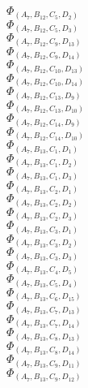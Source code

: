\documentclass[14pt]{article}
\begin{document}
    $\Phi_{({A}_{7}, {B}_{12}, {C}_{5}, {D}_{2})}$ \\ 
    $\Phi_{({A}_{7}, {B}_{12}, {C}_{5}, {D}_{3})}$ \\ 
    $\Phi_{({A}_{7}, {B}_{12}, {C}_{9}, {D}_{13})}$ \\ 
    $\Phi_{({A}_{7}, {B}_{12}, {C}_{9}, {D}_{14})}$ \\ 
    $\Phi_{({A}_{7}, {B}_{12}, {C}_{10}, {D}_{13})}$ \\ 
    $\Phi_{({A}_{7}, {B}_{12}, {C}_{10}, {D}_{14})}$ \\ 
    $\Phi_{({A}_{7}, {B}_{12}, {C}_{13}, {D}_{9})}$ \\ 
    $\Phi_{({A}_{7}, {B}_{12}, {C}_{13}, {D}_{10})}$ \\ 
    $\Phi_{({A}_{7}, {B}_{12}, {C}_{14}, {D}_{9})}$ \\ 
    $\Phi_{({A}_{7}, {B}_{12}, {C}_{14}, {D}_{10})}$ \\ 
    $\Phi_{({A}_{7}, {B}_{13}, {C}_{1}, {D}_{1})}$ \\ 
    $\Phi_{({A}_{7}, {B}_{13}, {C}_{1}, {D}_{2})}$ \\ 
    $\Phi_{({A}_{7}, {B}_{13}, {C}_{1}, {D}_{3})}$ \\ 
    $\Phi_{({A}_{7}, {B}_{13}, {C}_{2}, {D}_{1})}$ \\ 
    $\Phi_{({A}_{7}, {B}_{13}, {C}_{2}, {D}_{2})}$ \\ 
    $\Phi_{({A}_{7}, {B}_{13}, {C}_{2}, {D}_{3})}$ \\ 
    $\Phi_{({A}_{7}, {B}_{13}, {C}_{3}, {D}_{1})}$ \\ 
    $\Phi_{({A}_{7}, {B}_{13}, {C}_{3}, {D}_{2})}$ \\ 
    $\Phi_{({A}_{7}, {B}_{13}, {C}_{3}, {D}_{3})}$ \\ 
    $\Phi_{({A}_{7}, {B}_{13}, {C}_{4}, {D}_{5})}$ \\ 
    $\Phi_{({A}_{7}, {B}_{13}, {C}_{5}, {D}_{4})}$ \\ 
    $\Phi_{({A}_{7}, {B}_{13}, {C}_{6}, {D}_{15})}$ \\ 
    $\Phi_{({A}_{7}, {B}_{13}, {C}_{7}, {D}_{13})}$ \\ 
    $\Phi_{({A}_{7}, {B}_{13}, {C}_{7}, {D}_{14})}$ \\ 
    $\Phi_{({A}_{7}, {B}_{13}, {C}_{8}, {D}_{13})}$ \\ 
    $\Phi_{({A}_{7}, {B}_{13}, {C}_{8}, {D}_{14})}$ \\ 
    $\Phi_{({A}_{7}, {B}_{13}, {C}_{9}, {D}_{11})}$ \\ 
    $\Phi_{({A}_{7}, {B}_{13}, {C}_{9}, {D}_{12})}$ \\ 
\end{document}
